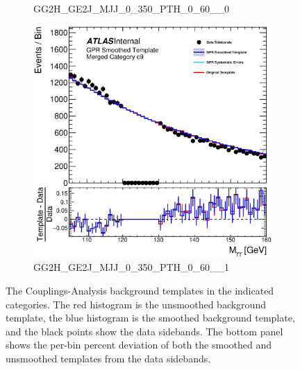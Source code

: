 \begin{figure}
\begin{center}
\begin{subfigure}[T]{0.49\linewidth}
	\caption{GG2H\_GE2J\_MJJ\_0\_350\_PTH\_0\_60\_\_0}
\end{subfigure}
\begin{subfigure}[T]{0.49\linewidth}
	\centering
	\includegraphics[width=\linewidth]{figures/background/gpr/coupCatTemplates/GPR_Smoothed_Plot_hmgg_c9.eps}
	\caption{GG2H\_GE2J\_MJJ\_0\_350\_PTH\_0\_60\_\_1}
\end{subfigure}
\caption{The Couplings-Analysis background templates in the indicated categories. The red histogram is the unsmoothed background template, the blue histogram is the smoothed background template, and the black points show the data sidebands. The bottom panel shows the per-bin percent deviation of both the smoothed and unsmoothed templates from the data sidebands. }
\label{fig:gpr_coupcat_2}
\end{center}
\end{figure}

